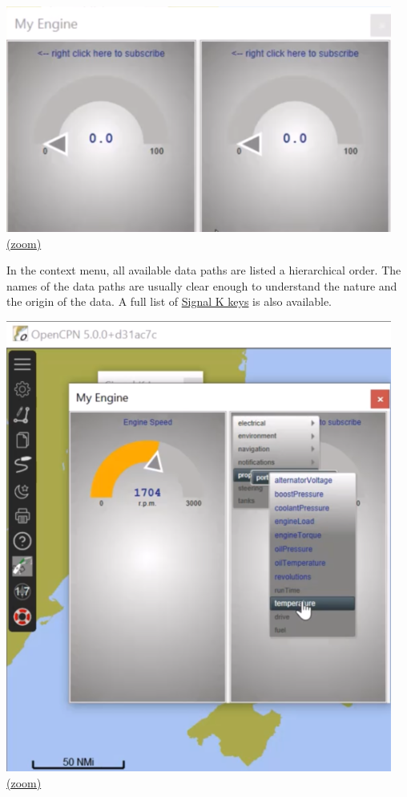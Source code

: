 \documentclass[11pt]{article}
\begin{document}
    \includegraphics{2020-02-15_EngineDJG_received_all_paths.png}
\href{img/2020-02-15_EngineDJG_received_all_paths.png}{(zoom)}

    In the context menu, all available data paths are listed a hierarchical
order. The names of the data paths are usually clear enough to
understand the nature and the origin of the data. A full list of
\href{https://github.com/SignalK/specification/blob/master/gitbook-docs/keys.md}{Signal
K keys} is also available.

    \includegraphics{2020-02-15_EngineDJG_select_from_available_paths-1.png}
\href{img/2020-02-15_EngineDJG_select_from_available_paths-1.png}{(zoom)}
\end{document}
